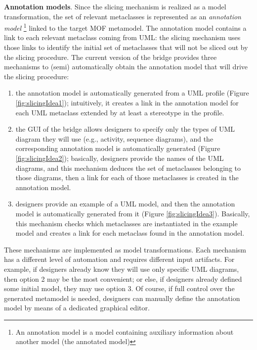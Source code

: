 \textbf{Annotation models}. Since the slicing mechanism is realized as a model transformation, the set of relevant metaclasses is represented as an \textit{annotation model}
\footnote{An annotation model is a model containing auxiliary information about another model (the annotated model)\cite{MCDFthesis}} linked to the target MOF metamodel.
The annotation model contains a link to each relevant metaclass coming from UML: the slicing mechanism uses those links to identify the initial set of metaclasses that will not be sliced out by the slicing procedure.
The current version of the bridge provides three mechanisms to (semi) automatically obtain the annotation model that will drive the slicing procedure:
%
\begin{enumerate}
	\item the annotation model is automatically generated from a UML profile (Figure \ref{fig:slicingIdea1}); intuitively, it creates a link in the annotation model
	for each UML metaclass extended by at least a stereotype in the profile.
	\item the GUI of the bridge allows designers to specify only the types of UML diagram they will use (e.g., activity, sequence diagrams), and the corresponding annotation model
	is automatically generated (Figure \ref{fig:slicingIdea2}); basically, designers provide the names of the UML diagrams, and this mechanism deduces the set of metaclasses belonging to those diagrams, then a link for each of those metaclasses is created in the annotation model.
	\item designers provide an example of a UML model, and then the annotation model is automatically generated from it (Figure \ref{fig:slicingIdea3}).
	Basically, this mechanism checks which metaclasses are instantiated in the example model and creates a link for each metaclass found in the annotation model.
\end{enumerate}
%
These mechanisms are implemented as model transformations. Each mechanism has a different level of automation and requires different input artifacts. For example, if designers already know they will use only specific UML diagrams, then option 2 may be the most convenient;
or else, if designers already defined some initial model, they may use option 3.
Of course, if full control over the generated metamodel is needed, designers can manually define the annotation model by means of a dedicated graphical editor.
